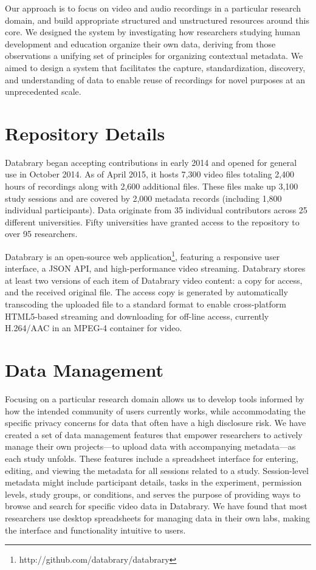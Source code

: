 \documentclass{sig-alternate-2013}
\begin{document}
Our approach is to focus on video and audio recordings in a particular research domain, and build appropriate structured and unstructured resources around this core.
We designed the system by investigating how researchers studying human development and education organize their own data, deriving from those observations a unifying set of principles for organizing contextual metadata.
We aimed to design a system that facilitates the capture, standardization, discovery, and understanding of data to enable reuse of recordings for novel purposes at an unprecedented scale.

\section{Repository Details}

Databrary began accepting contributions in early 2014 and opened for general use in October 2014.
As of April 2015, it hosts 7,300 video files totaling 2,400 hours of recordings along with 2,600 additional files.
These files make up 3,100 study sessions and are covered by 2,000 metadata records (including 1,800 individual participants).
Data originate from 35 individual contributors across 25 different universities. Fifty universities have granted access to the repository to over 95 researchers.

Databrary is an open-source web application\footnote{http://github.com/databrary/databrary}, featuring a responsive user interface, a JSON API, and high-performance video streaming.
Databrary stores at least two versions of each item of Databrary video content: a copy for access, and the received original file.
The access copy is generated by automatically transcoding the uploaded file to a standard format to enable cross-platform HTML5-based streaming and downloading for off-line access, currently H.264/AAC in an MPEG-4 container for video.

\section{Data Management}

Focusing on a particular research domain allows us to develop tools informed by how the intended community of users currently works, while accommodating the specific privacy concerns for data that often have a high disclosure risk.
We have created a set of data management features that empower researchers to actively manage their own projects---to upload data with accompanying metadata---as each study unfolds. 
These features include a spreadsheet interface for entering, editing, and viewing the metadata for all sessions related to a study.
Session-level metadata might include participant details, tasks in the experiment, permission levels, study groups, or conditions, and serves the purpose of providing ways to browse and search for specific video data in Databrary. 
We have found that most researchers use desktop spreadsheets for managing data in their own labs, making the interface and functionality intuitive to users. 
\end{document}
